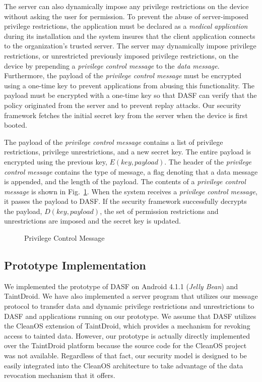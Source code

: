 The server can also dynamically impose any privilege restrictions on
the device without asking the user for permission.  To prevent the
abuse of server-imposed privilege restrictions, the application must
be declared as a \textit{medical application} during its installation
and the system insures that the client application connects to the
organization's trusted server.  The server may dynamically impose
privilege restrictions, or unrestricted previously imposed privilege
restrictions, on the device by prepending a
\textit{privilege control message} to the \textit{data message}.
Furthermore, the payload of the \textit{privilege control message} must be
encrypted using a one-time key to prevent applications from abusing
this functionality.  The payload must be encrypted with a one-time
key so that DASF can verify that the policy
originated from the server and to prevent replay attacks.  Our
security framework fetches the initial secret key from the server
when the device is first booted.

The payload of the \textit{privilege control message} contains a list
of privilege restrictions, privilege unrestrictions, and a new secret
key.  The entire payload is encrypted using the previous key,
$E\left(key, payload\right)$.  The header of the \textit{privilege control
 message} contains the type of message, a flag denoting that a data message
is appended, and the length of the payload. The contents of 
a \textit{privilege control message} is shown in
Fig.~\ref{fig:privilegemessage}.  When the system receives a
\textit{privilege control message}, it passes the payload to DASF.
If the security framework successfully decrypts
the payload, $D\left(key, payload\right)$, the set of permission restrictions
and unrestrictions are imposed and the secret key is updated.

\begin{figure}[ht]
\centering
{}
\caption{Privilege Control Message}
\label{fig:privilegemessage}
\end{figure}

\vspace{-5mm}
\subsection{Prototype Implementation}

We implemented the prototype of DASF on Android 4.1.1
(\textit{Jelly Bean}) and TaintDroid.  We have also implemented a
server program that utilizes our message protocol to transfer data
and dynamic privilege restrictions and unrestrictions to DASF
and applications running on our prototype.  We assume
that DASF utilizes the CleanOS extension of TaintDroid, which
provides a mechanism for revoking access to tainted data. However, our prototype
is actually directly implemented over the TaintDroid platform because
the source code for the CleanOS project was not available.  Regardless
of that fact, our security model is designed to be easily integrated into
the CleanOS architecture to take advantage of the data revocation
mechanism that it offers.

